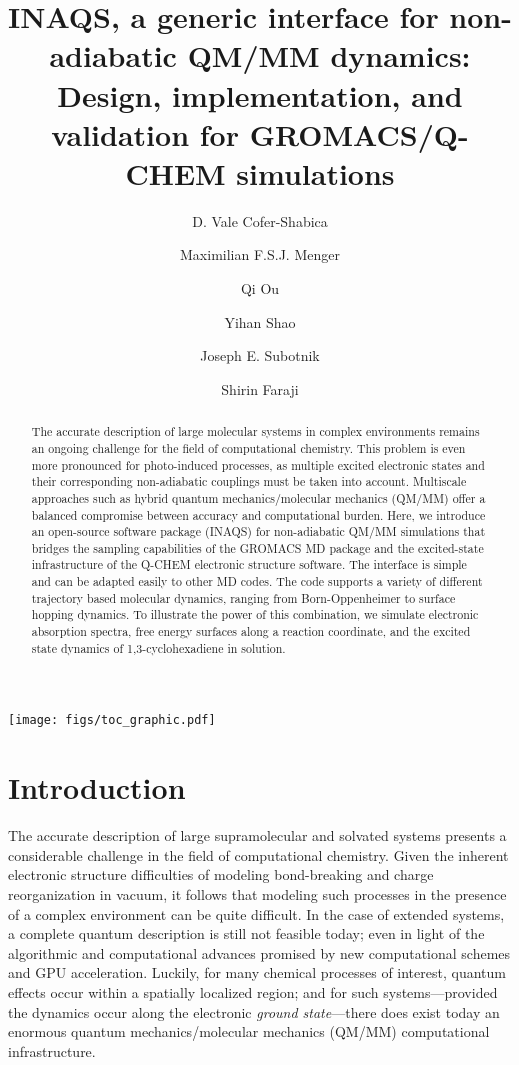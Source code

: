 \documentclass[journal=jctcce,manuscript=article,layout=traditional]{achemso}
\author{D. Vale Cofer-Shabica}
\affiliation[upenn] {\upenn}
\author{Maximilian F.S.J. Menger}
\affiliation[unigro] {\unigro}
\author{Qi Ou}
\affiliation[casai] {\casai}
\author{Yihan Shao}
\affiliation[uokla] {\uokla}
\author{Joseph E. Subotnik}
\affiliation[upenn] {\upenn}
\author{Shirin Faraji}
\affiliation[unigro] {\unigro}
\title[INAQS]{{INAQS}, a generic interface for non-adiabatic {QM/MM} dynamics: Design, implementation, and validation for GROMACS/Q-CHEM simulations}
\begin{document}
%
%
%
%
%
%
\begin{tocentry}
\centering
\texttt{[image: figs/toc\_graphic.pdf]}
\end{tocentry}

%
%
%
%
\begin{abstract}
The accurate description of large molecular systems in complex environments remains an ongoing challenge for the field of computational chemistry. This problem is even more pronounced for photo-induced processes, as multiple excited electronic states and their corresponding non-adiabatic couplings must be taken into account. Multiscale approaches such as hybrid quantum mechanics/molecular mechanics (QM/MM) offer a balanced compromise between accuracy and computational burden. 
Here, we introduce an open-source software package (INAQS) for non-adiabatic QM/MM simulations that bridges the sampling capabilities of the GROMACS MD package and the excited-state infrastructure of the Q-CHEM electronic structure software. The interface is simple and can be adapted easily to other MD codes. The code supports a variety of
different trajectory based molecular dynamics, ranging from Born-Oppenheimer to surface hopping dynamics.
To illustrate the power of this combination, we simulate electronic absorption spectra, free energy surfaces along a reaction coordinate, and the excited state dynamics of  1,3-cyclohexadiene in solution.
\end{abstract}

%
%
%
%
%
%
%
%

%
%
%


\section{Introduction}
%
The accurate description of large supramolecular and solvated systems presents a considerable challenge in the field of computational chemistry.
Given the inherent electronic structure difficulties of modeling bond-breaking and charge reorganization  in vacuum, it follows that modeling such processes in the presence of a complex environment can be quite difficult.
In the case of  extended systems, a complete quantum description is still not feasible today; even in light of the algorithmic and computational advances promised by new computational schemes\cite{xtb,neese2016:DLPNOgrad,akimov_large-scale_2015,groenhof2015:qmmmPMF} and GPU acceleration.\cite{terachem,brianQC,g16b01}
Luckily, for many chemical processes of interest, quantum effects  occur within a spatially localized region; and for such systems---provided the dynamics occur along the  electronic \emph{ground state}---there does exist today an enormous quantum mechanics/molecular mechanics (QM/MM) computational infrastructure.
\end{document}
